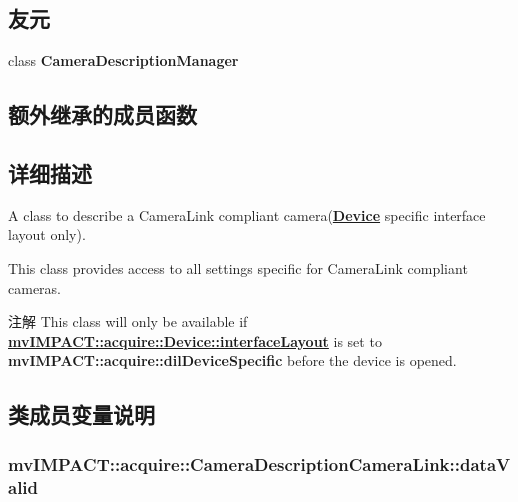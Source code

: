 \subsection*{友元}
\begin{DoxyCompactItemize}
\item 
\hypertarget{classmv_i_m_p_a_c_t_1_1acquire_1_1_camera_description_camera_link_a754f74db1fd8a2e7cf0bca76c10d00dd}{class {\bfseries Camera\+Description\+Manager}}\label{classmv_i_m_p_a_c_t_1_1acquire_1_1_camera_description_camera_link_a754f74db1fd8a2e7cf0bca76c10d00dd}

\end{DoxyCompactItemize}
\subsection*{额外继承的成员函数}


\subsection{详细描述}
A class to describe a Camera\+Link\textregistered{} compliant camera({\bfseries \hyperlink{classmv_i_m_p_a_c_t_1_1acquire_1_1_device}{Device}} specific interface layout only). 

This class provides access to all settings specific for Camera\+Link\textregistered{} compliant cameras.

\begin{DoxyNote}{注解}
This class will only be available if {\bfseries \hyperlink{classmv_i_m_p_a_c_t_1_1acquire_1_1_device_ab4dd0ecc9d456bb5ddc01d844c9d6f2d}{mv\+I\+M\+P\+A\+C\+T\+::acquire\+::\+Device\+::interface\+Layout}} is set to {\bfseries mv\+I\+M\+P\+A\+C\+T\+::acquire\+::dil\+Device\+Specific} before the device is opened. 
\end{DoxyNote}


\subsection{类成员变量说明}
\hypertarget{classmv_i_m_p_a_c_t_1_1acquire_1_1_camera_description_camera_link_acf103eb0dc8dfb45567c4be3e1fe001e}{
\subsubsection[{data\+Valid}]{ mv\+I\+M\+P\+A\+C\+T\+::acquire\+::\+Camera\+Description\+Camera\+Link\+::data\+Valid}}\label{classmv_i_m_p_a_c_t_1_1acquire_1_1_camera_description_camera_link_acf103eb0dc8dfb45567c4be3e1fe001e}


